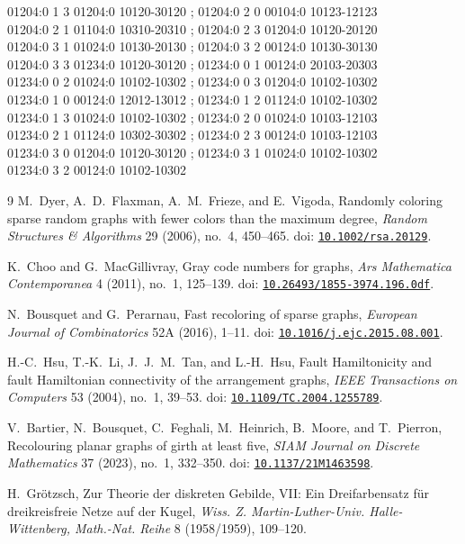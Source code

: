\documentclass[11pt]{article}
\newcommand{\doi}[1]{doi: \href{https://doi.org/#1}{\nolinkurl{#1}}}
\theoremstyle{remark}
\numberwithin{equation}{section}
\numberwithin{table}{section}
\begin{document}
\begin{flushleft}
01204:0 1 3 01204:0 10120-30120 ; 01204:0 2 0 00104:0 10123-12123\\
01204:0 2 1 01104:0 10310-20310 ; 01204:0 2 3 01204:0 10120-20120\\
01204:0 3 1 01024:0 10130-20130 ; 01204:0 3 2 00124:0 10130-30130\\
01204:0 3 3 01234:0 10120-30120 ; 01234:0 0 1 00124:0 20103-20303\\
01234:0 0 2 01024:0 10102-10302 ; 01234:0 0 3 01204:0 10102-10302\\
01234:0 1 0 00124:0 12012-13012 ; 01234:0 1 2 01124:0 10102-10302\\
01234:0 1 3 01024:0 10102-10302 ; 01234:0 2 0 01024:0 10103-12103\\
01234:0 2 1 01124:0 10302-30302 ; 01234:0 2 3 00124:0 10103-12103\\
01234:0 3 0 01204:0 10120-30120 ; 01234:0 3 1 01024:0 10102-10302\\
01234:0 3 2 00124:0 10102-10302\\
\end{flushleft}\endgroup

\begin{thebibliography}{9}
M.~Dyer, A.~D.~Flaxman, A.~M.~Frieze, and E.~Vigoda,
\newblock Randomly coloring sparse random graphs with fewer colors than the maximum degree,
\newblock \emph{Random Structures \& Algorithms} 29 (2006), no.~4, 450--465.
\newblock \doi{10.1002/rsa.20129}.

K.~Choo and G.~MacGillivray,
\newblock Gray code numbers for graphs,
\newblock \emph{Ars Mathematica Contemporanea} 4 (2011), no.~1, 125--139.
\newblock \doi{10.26493/1855-3974.196.0df}.

N.~Bousquet and G.~Perarnau,
\newblock Fast recoloring of sparse graphs,
\newblock \emph{European Journal of Combinatorics} 52A (2016), 1--11.
\newblock \doi{10.1016/j.ejc.2015.08.001}.

H.-C.~Hsu, T.-K.~Li, J.~J.~M.~Tan, and L.-H.~Hsu,
\newblock Fault Hamiltonicity and fault Hamiltonian connectivity of the arrangement graphs,
\newblock \emph{IEEE Transactions on Computers} 53 (2004), no.~1, 39--53.
\newblock \doi{10.1109/TC.2004.1255789}.

V.~Bartier, N.~Bousquet, C.~Feghali, M.~Heinrich, B.~Moore, and T.~Pierron,
\newblock Recolouring planar graphs of girth at least five,
\newblock \emph{SIAM Journal on Discrete Mathematics} 37 (2023), no.~1, 332--350.
\newblock \doi{10.1137/21M1463598}.

H.~Gr\"otzsch,
\newblock Zur Theorie der diskreten Gebilde, VII: Ein Dreifarbensatz f\"ur dreikreisfreie Netze auf der Kugel,
\newblock \emph{Wiss. Z. Martin-Luther-Univ. Halle-Wittenberg, Math.-Nat. Reihe} 8 (1958/1959), 109--120.
\end{thebibliography}
\end{document}
